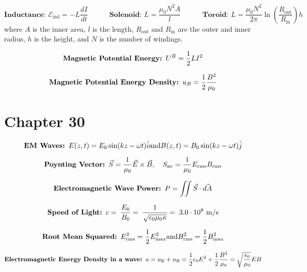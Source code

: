 \documentclass[fleqn,12pt]{article}
\begin{document}
\begin{equation} \label{eq1}
 \textbf{Inductance: }\mathcal{E}_\mathrm{ind} = -L \frac{dI}{dt}
 \quad \quad \quad \textbf{Solenoid: }L = \frac{\mu_0 N^2 A}{l}
 \quad \quad \quad \textbf{Toroid: }L = \frac{\mu_0 N^2}{2\pi}\ln \left( \frac{R_\mathrm{out}}{R_\mathrm{in}} \right)h
\end{equation}
where $A$ is the inner area, $l$ is the length, $R_\mathrm{out}$ and $R_\mathrm{in}$ are the outer and inner radius, $h$ is the height, and $N$ is the number of windings.

\begin{equation}
    \label{eq2}
   \mbox{\textbf{Magnetic Potential Energy: }} U^B = \frac{1}{2}LI^2
\end{equation}

\begin{equation}
    \label{eq3}
    \mbox{\textbf{Magnetic Potential Energy Density: }}u_B = \frac{1}{2}\frac{B^2}{\mu_0}
\end{equation}

\section*{Chapter 30}

\begin{equation}
    \label{eq3}
    \mbox{\textbf{EM Waves: }}
    {E}(z,t) = {E_0}\sin(kz - \omega t)\hat{i} \\ \mbox{and} \\ {B}(z,t) = {B_0}\sin(kz - \omega t)\hat{j}
\end{equation}


\begin{equation}
    \label{eq3}
    \mbox{\textbf{Poynting Vector: }}
    \vec{S} = \frac{1}{\mu_0}\vec{E} \times \vec{B},\quad S_\mathrm{av} = \frac{1}{\mu_0}E_\mathrm{rms}B_\mathrm{rms}
\end{equation}

\begin{equation}
    \label{eq3}
    \mbox{\textbf{Electromagnetic Wave Power: }}
    P = \iint \vec{S} \cdot \vec{dA}
\end{equation}

\begin{equation}
    \label{eq3}
    \mbox{\textbf{Speed of Light: }}
    c = \; \frac{E_0}{B_0} = \; \frac{1}{\sqrt{\epsilon_0\mu_0\kappa}}  = \; 3.0 \cdot 10^8 \  \si{\meter\per\second}
\end{equation}

\begin{equation}
    \label{eq3}
    \mbox{\textbf{Root Mean Squared: }}
    E_\mathrm{rms}^{2} = \frac{1}{2}E_\mathrm{max}^2 \\ \mbox{and} \\ B_\mathrm{rms}^{2} = \frac{1}{2}B_\mathrm{max}^2
\end{equation}

\begin{equation}
    \label{eq3}
    \mbox{\textbf{Electromagnetic Energy Density in a wave: }}
    u = u_\mathrm{E} + u_\mathrm{B} = \frac{1}{2}\epsilon_0E^2 + \frac{1}{2}\frac{B^2}{\mu_0} = \sqrt{\frac{\epsilon_0}{\mu_0}}E B
\end{equation}
\end{document}

